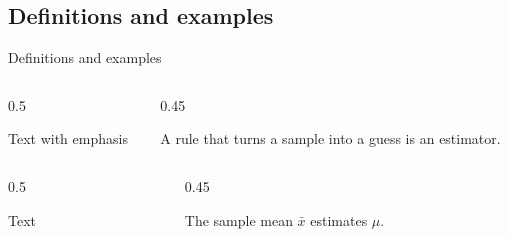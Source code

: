 \subsection{Definitions and examples}
\begin{frame}{Definitions and examples}
\begin{columns}[T,onlytextwidth]
\begin{column}{0.5\textwidth}
\begin{codeonly}
\begin{definition}[Title]
  Text with \alert{emphasis}
\end{definition}
\end{codeonly}
\end{column}
\begin{column}{0.45\textwidth}
\stepoffset
\begin{definition}[Estimator]
    A rule that turns a sample into a guess is an \alert{estimator}.
\end{definition}
\end{column}
\end{columns}
\bigskip
\begin{columns}[T,onlytextwidth]
\begin{column}{0.5\textwidth}
\begin{codeonly}
\begin{example}
  Text
\end{example}
\end{codeonly}
\end{column}
\begin{column}{0.45\textwidth}
\stepoffset
\begin{example}
    The sample mean $\bar{x}$ estimates $\mu$.
\end{example}
\end{column}
\end{columns}
\end{frame}

